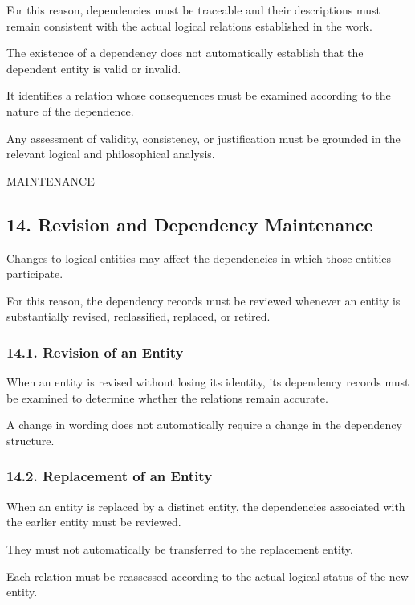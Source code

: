 For this reason, dependencies
must be traceable and their
descriptions must remain
consistent with the actual
logical relations established
in the work.

The existence of a dependency
does not automatically establish
that the dependent entity
is valid or invalid.

It identifies a relation
whose consequences must
be examined according to
the nature of the dependence.

Any assessment of validity,
consistency, or justification
must be grounded in the
relevant logical and philosophical
analysis.

MAINTENANCE

\subsection*{14. Revision and Dependency
Maintenance}

Changes to logical entities
may affect the dependencies
in which those entities
participate.

For this reason, the dependency
records must be reviewed
whenever an entity is
substantially revised,
reclassified, replaced,
or retired.

\subsubsection*{14.1. Revision of an Entity}

When an entity is revised
without losing its identity,
its dependency records
must be examined to determine
whether the relations remain
accurate.

A change in wording does
not automatically require
a change in the dependency
structure.

\subsubsection*{14.2. Replacement of an Entity}

When an entity is replaced
by a distinct entity, the
dependencies associated
with the earlier entity
must be reviewed.

They must not automatically
be transferred to the
replacement entity.

Each relation must be
reassessed according to
the actual logical status
of the new entity.

